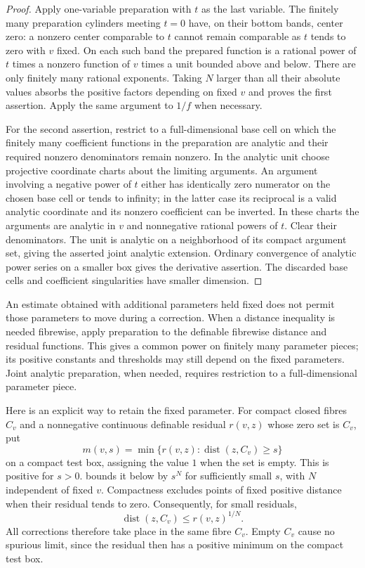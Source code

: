 \begin{proof}
Apply one-variable preparation with $t$ as the last variable. The finitely many preparation cylinders meeting $t=0$ have, on their bottom bands, center zero: a nonzero center comparable to $t$ cannot remain comparable as $t$ tends to zero with $v$ fixed. On each such band the prepared function is a rational power of $t$ times a nonzero function of $v$ times a unit bounded above and below. There are only finitely many rational exponents. Taking $N$ larger than all their absolute values absorbs the positive factors depending on fixed $v$ and proves the first assertion. Apply the same argument to $1/f$ when necessary.

For the second assertion, restrict to a full-dimensional base cell on which the finitely many coefficient functions in the preparation are analytic and their required nonzero denominators remain nonzero. In the analytic unit choose projective coordinate charts about the limiting arguments. An argument involving a negative power of $t$ either has identically zero numerator on the chosen base cell or tends to infinity; in the latter case its reciprocal is a valid analytic coordinate and its nonzero coefficient can be inverted. In these charts the arguments are analytic in $v$ and nonnegative rational powers of $t$. Clear their denominators. The unit is analytic on a neighborhood of its compact argument set, giving the asserted joint analytic extension. Ordinary convergence of analytic power series on a smaller box gives the derivative assertion. The discarded base cells and coefficient singularities have smaller dimension.
\end{proof}

\begin{remark}\label{rem:prep-fixed-parameters}
An estimate obtained with additional parameters held fixed does not permit those parameters to move during a correction. When a distance inequality is needed fibrewise, apply preparation to the definable fibrewise distance and residual functions. This gives a common power on finitely many parameter pieces; its positive constants and thresholds may still depend on the fixed parameters. Joint analytic preparation, when needed, requires restriction to a full-dimensional parameter piece.

Here is an explicit way to retain the fixed parameter. For compact closed fibres $C_v$ and a nonnegative continuous definable residual $r(v,z)$ whose zero set is $C_v$, put
\[
 m(v,s)=\min\{r(v,z):\operatorname{dist}(z,C_v)\geq s\}
\]
on a compact test box, assigning the value $1$ when the set is empty. This is positive for $s>0$.  bounds it below by $s^N$ for sufficiently small $s$, with $N$ independent of fixed $v$. Compactness excludes points of fixed positive distance when their residual tends to zero. Consequently, for small residuals,
\[
 \operatorname{dist}(z,C_v)\leq r(v,z)^{1/N}.
\]
All corrections therefore take place in the same fibre $C_v$. Empty $C_v$ cause no spurious limit, since the residual then has a positive minimum on the compact test box.
\end{remark}

